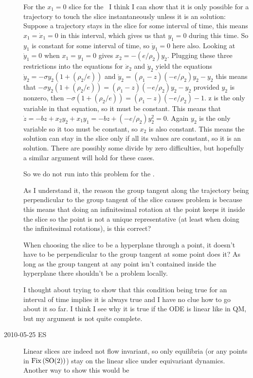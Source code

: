 \begin{description}
    For the $x_1 = 0$ slice for the \cLe\ I think I can show that it is only possible for a trajectory to touch the slice instantaneously unless it is an {\eqv} solution: Suppose a trajectory stays in the slice for some interval of time, this means $x_1 = \dot x_1 = 0$ in this interval, which gives us that $y_1 = 0$ during this time. So $y_1$ is constant for some interval of time, so $\dot y_1=0$ here also. Looking at $\dot y_1 = 0$ when $x_1=y_1 =0$ gives $x_2 = -(e/\rho_2)y_2$. Plugging these three restrictions into the equations for $\dot x_2$ and $\dot y_2$ yield the equations $\dot y_2=-\sigma y_2 (1+(\rho_2 / e))$ and $\dot y_2 = (\rho_1 - z)(-e/\rho_2)y_2-y_2$ this means that $-\sigma y_2 (1+(\rho_2 / e))=(\rho_1 - z)(-e/\rho_2)y_2-y_2$ provided $y_2$ is nonzero, then $-\sigma (1+(\rho_2 / e))=(\rho_1-z)(-e/\rho_2)-1$. z is the only variable in that equation, so it must be constant. This means that $\dot z = -b z + x_2 y_2 + x_1 y_1=-b z+ (-e/\rho_2)y_2^2=0$. Again $y_2$ is the only variable so it too must be constant, so $x_2$ is also constant. This means the solution can stay in the slice only if all its values are constant, so it is an {\eqv} solution. There are possibly some divide by zero difficulties, but hopefully a similar argument will hold for these cases.

    So we do not run into this problem for the \cLf.

    As I understand it, the reason the group tangent along the trajectory being perpendicular to the group tangent of the slice causes problem is because this means that doing an infinitesimal rotation at the point keeps it inside the slice so the point is not a unique representative (at least when doing the infinitesimal rotations), is this correct?

    When choosing the slice to be a hyperplane through a point, it doesn't have to be perpendicular to the group tangent at some point does it? As long as the group tangent at any point isn't contained inside the hyperplane there shouldn't be a problem locally.

    I thought about trying to show that this condition being true for an interval of time implies it is always true and I have no clue how to go about it so far. I think I see why it is true if the ODE is linear like in QM, but my argument is not quite complete.


\item[2010-05-25 ES] Linear slices are indeed not flow invariant, so only equilibria (or any points in $\mathrm{Fix}\left(\textrm{SO}(2)\right)$) stay on the linear slice
under equivariant dynamics. Another way to show this would be


\end{description}
